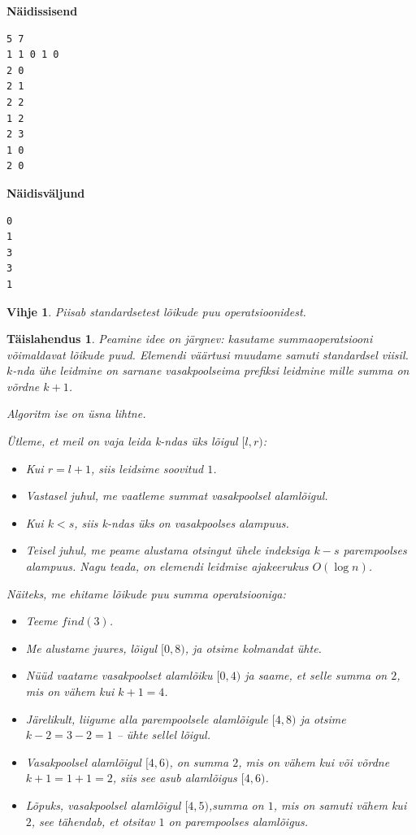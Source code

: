 \documentclass{trkut}
\newtheorem*{vihje}{Vihje}
\newtheorem*{solution}{Täislahendus}
\begin{document}
\textbf{Näidissisend}

\begin{verbatim}
5 7
1 1 0 1 0
2 0
2 1
2 2
1 2
2 3
1 0
2 0
\end{verbatim}

\textbf{Näidisväljund}

\begin{verbatim}
0
1
3
3
1
\end{verbatim}


\begin{vihje}
Piisab standardsetest lõikude puu operatsioonidest.
\end{vihje}

\begin{solution}
Peamine idee on järgnev: kasutame summaoperatsiooni võimaldavat lõikude puud. Elemendi väärtusi muudame samuti standardsel viisil. 
$k$-nda ühe leidmine on sarnane vasakpoolseima prefiksi leidmine mille summa on võrdne $k+1$. 

Algoritm ise on üsna lihtne.

Ütleme, et meil on vaja leida k-ndas üks lõigul $[l,r)$:
\begin{itemize}
\item Kui $r=l+1$, siis leidsime soovitud $1$. 
\item Vastasel juhul, me vaatleme summat vasakpoolsel alamlõigul. 
\item Kui $k<s$, siis k-ndas üks on vasakpoolses alampuus. 
\item Teisel juhul, me peame alustama otsingut ühele indeksiga $k−s$ parempoolses alampuus. Nagu teada, on elemendi leidmise ajakeerukus $O(\log n)$. 
\end{itemize}
Näiteks, me ehitame lõikude puu summa operatsiooniga:
\begin{itemize}
\item Teeme $find(3)$. 
\item Me alustame juures, lõigul $[0,8)$, ja otsime kolmandat ühte. 
\item Nüüd vaatame vasakpoolset alamlõiku $[0,4)$ ja saame, et selle summa on $2$, mis on vähem kui $k+1=4$. 
\item Järelikult, liigume alla parempoolsele alamlõigule $[4,8)$ ja otsime $k−2=3−2=1$ -- ühte sellel lõigul.
\item Vasakpoolsel alamlõigul $[4,6)$, on summa $2$, mis on vähem kui või võrdne $k+1=1+1=2$, siis see asub alamlõigus $[4,6)$.
\item Lõpuks, vasakpoolsel alamlõigul $[4,5)$,summa on $1$, mis on samuti vähem kui $2$, see tähendab, et otsitav $1$ on parempoolses alamlõigus.
\end{itemize}


\end{solution}
\end{document}
